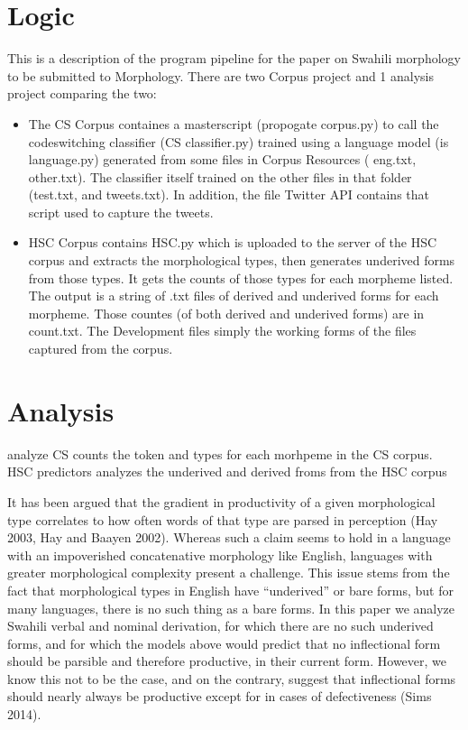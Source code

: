 \documentclass{article}\usepackage[]{graphicx}\usepackage[]{color}
\begin{document}
\section{Logic}
\par This is a description of the program pipeline for the paper on Swahili morphology to be submitted to Morphology. There are two Corpus project and 1 analysis project comparing the two:

\begin{itemize}
  \item \par The CS Corpus containes a masterscript (propogate corpus.py) to call the codeswitching classifier (CS classifier.py) trained using a language model (is language.py)  generated from some files in Corpus Resources ( eng.txt, other.txt). The classifier itself trained on the other files in that folder (test.txt, and tweets.txt). In addition, the file Twitter API contains that script used to capture the tweets.

\item \par HSC Corpus contains HSC.py which is uploaded to the server of the HSC corpus and extracts the morphological types, then generates underived forms from those types. It gets the counts of those types for each morpheme listed. The output is a string of .txt files of derived and underived forms for each morpheme. Those countes (of both derived and underived forms) are in count.txt. The Development files simply the working forms of the files captured from the corpus.
\end{itemize}

\section{Analysis}

\par analyze CS counts the token and types for each morhpeme in the CS corpus. HSC predictors analyzes the underived and derived froms from the HSC corpus

\par It has been argued that the gradient in productivity of a given morphological type correlates to how often words of that type are parsed in perception (Hay 2003, Hay and Baayen 2002). Whereas such a claim seems to hold in a language with an impoverished concatenative morphology like English, languages with greater morphological complexity present a challenge. This issue stems from the fact that morphological types in English have “underived” or bare forms, but for many languages, there is no such thing as a bare forms. In this paper we analyze Swahili verbal and nominal derivation, for which there are no such underived forms, and for which the models above would predict that no inflectional form should be parsible and therefore productive, in their current form. However, we know this not to be the case, and on the contrary, suggest that inflectional forms should nearly always be productive except for in cases of defectiveness (Sims 2014). 
\end{document}
